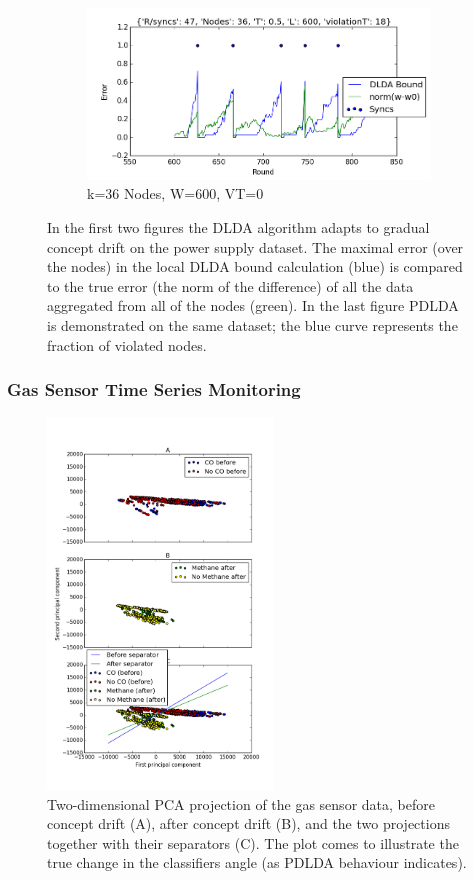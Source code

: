 \documentclass{sig-alternate-05-2015}
\begin{document}
\begin{figure}
    \begin{subfigure}[b]{0.5\textwidth}
        \includegraphics[width=\textwidth]{PowerSupply/36nodesProb.png}
        \caption{k=36 Nodes, W=600, VT=0}
        \label{fig:mouse}
    \end{subfigure}
    \caption{In the first two figures the DLDA algorithm adapts
  to gradual concept drift on the power supply dataset.
  The maximal error (over the nodes) in the
  local DLDA bound calculation (blue) is compared to the true
error (the norm of the difference) of all the data aggregated from
all of the nodes (green). In the last figure PDLDA
is demonstrated on the same dataset; the blue curve represents the
fraction of violated nodes.}\label{PowerSupplyFigures}
\end{figure}




\subsubsection{Gas Sensor Time Series Monitoring}

\begin{figure}[h!]
\centering
\includegraphics[width=60mm]{BigGas/showData.png}
\caption{Two-dimensional PCA projection of the gas sensor data,
before concept drift (A), after concept drift (B),
and the two projections together with their separators (C).
The plot comes to illustrate the true change in the classifiers angle (as PDLDA
behaviour indicates).}
\label{BigGasShowData}
\end{figure}
\end{document}

